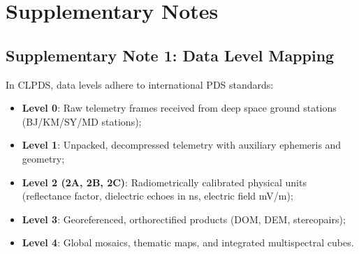 \documentclass[11pt,letterpaper]{article}
\begin{document}
\section{Supplementary Notes}

\subsection{Supplementary Note 1: Data Level Mapping}
In CLPDS, data levels adhere to international PDS standards:
\begin{itemize}
    \item \textbf{Level 0}: Raw telemetry frames received from deep space ground stations (BJ/KM/SY/MD stations);
    \item \textbf{Level 1}: Unpacked, decompressed telemetry with auxiliary ephemeris and geometry;
    \item \textbf{Level 2 (2A, 2B, 2C)}: Radiometrically calibrated physical units (reflectance factor, dielectric echoes in ns, electric field mV/m);
    \item \textbf{Level 3}: Georeferenced, orthorectified products (DOM, DEM, stereopairs);
    \item \textbf{Level 4}: Global mosaics, thematic maps, and integrated multispectral cubes.
\end{itemize}
\end{document}
